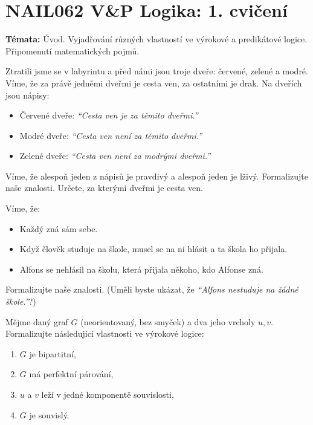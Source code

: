 \documentclass[a4paper,12pt]{article}
\begin{document}
\section*{NAIL062 V\&P Logika: 1. cvičení}


\textbf{Témata:} Úvod. Vyjadřování různých vlastností ve výrokové a predikátové logice. Připomenutí matematických pojmů.


\medskip\begin{problem}
Ztratili jsme se v labyrintu a před námi jsou troje dveře: červené, zelené a modré. Víme, že za právě jedněmi dveřmi je cesta ven, za ostatními je drak. Na dveřích jsou nápisy:
\begin{itemize}
    \item Červené dveře: {\it ``Cesta ven je za těmito dveřmi.''}
    \item Modré dveře: {\it ``Cesta ven není za těmito dveřmi.''}
    \item Zelené dveře: {\it ``Cesta ven není za modrými dveřmi.''}
\end{itemize}
Víme, že alespoň jeden z nápisů je pravdivý a alespoň jeden je lživý. Formalizujte naše znalosti. Určete, za kterými dveřmi je cesta ven.
\end{problem}


\medskip\begin{problem} Víme, že:
\begin{itemize}\it
\item Každý zná sám sebe.
\item Když člověk studuje na škole, musel se na ni hlásit a ta škola ho přijala.
\item Alfons se nehlásil na školu, která přijala někoho, kdo Alfonse zná.
\end{itemize}
Formalizujte naše znalosti. (Uměli byste ukázat, že {\it ``Alfons nestuduje na žádné škole.''}?)
\end{problem}


\medskip\begin{problem}
Mějme daný graf $G$ (neorientovaný, bez smyček) a dva jeho vrcholy $u,v$. Formalizujte následující vlastnosti ve výrokové logice:
\begin{enumerate}
    \item $G$ je bipartitní,
    \item $G$ má perfektní párování,
    \item $u$ a $v$ leží v jedné komponentě souvislosti,
    \item $G$ je souvislý.
\end{enumerate}
\end{problem}
\end{document}
